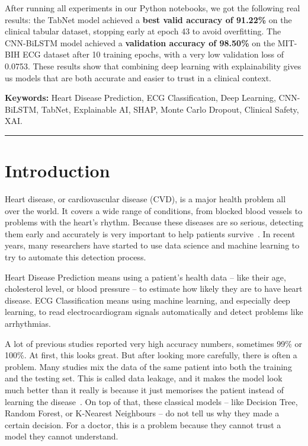 \documentclass[10pt, twocolumn]{article}
\newcommand{\jatitline}{\noindent\rule{\linewidth}{0.4pt}\par}
\begin{document}
After running all experiments in our Python notebooks, we got the following real results:
the TabNet model achieved a \textbf{best valid accuracy of 91.22\%} on the clinical tabular
dataset, stopping early at epoch 43 to avoid overfitting. The CNN-BiLSTM model achieved a
\textbf{validation accuracy of 98.50\%} on the MIT-BIH ECG dataset after 10 training epochs,
with a very low validation loss of 0.0753.
These results show that combining deep learning with explainability gives us models that are
both accurate and easier to trust in a clinical context.

\medskip
\noindent\textbf{Keywords:} Heart Disease Prediction, ECG Classification, Deep Learning,
CNN-BiLSTM, TabNet, Explainable AI, SHAP, Monte Carlo Dropout, Clinical Safety, XAI.

\jatitline

\section{Introduction}

Heart disease, or cardiovascular disease (CVD), is a major health problem all over the world.
It covers a wide range of conditions, from blocked blood vessels to problems with the heart's
rhythm. Because these diseases are so serious, detecting them early and accurately is very
important to help patients survive~\cite{iqbal2022}.
In recent years, many researchers have started to use data science and machine learning to try
to automate this detection process.

Heart Disease Prediction means using a patient's health data -- like their age, cholesterol
level, or blood pressure -- to estimate how likely they are to have heart disease.
ECG Classification means using machine learning, and especially deep learning, to read
electrocardiogram signals automatically and detect problems like arrhythmias.

A lot of previous studies reported very high accuracy numbers, sometimes 99\% or 100\%.
At first, this looks great. But after looking more carefully, there is often a problem.
Many studies mix the data of the same patient into both the training and the testing set.
This is called data leakage, and it makes the model look much better than it really is
because it just memorises the patient instead of learning the disease~\cite{kapoor2023}.
On top of that, these classical models -- like Decision Tree, Random Forest, or K-Nearest
Neighbours -- do not tell us why they made a certain decision. For a doctor, this is a
problem because they cannot trust a model they cannot understand.
\end{document}
